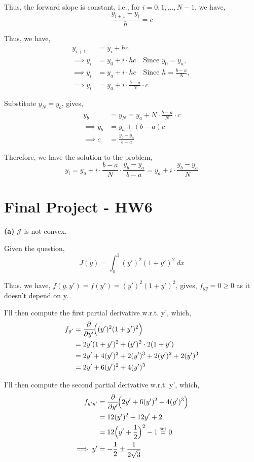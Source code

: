 \documentclass[12pt]{article}
\begin{document}
Thus, the forward slope is constant, i.e., for $i = 0, 1, ..., N-1$, we have, 
$$
\frac{y_{i+1}-y_i}{h}=c
$$

Thus, we have, 
\begin{align*}
	y_{i+1} &= y_i + hc \\
	\implies y_i &=y_0+i \cdot hc \quad \text{Since $y_0=y_a$, }\\
	\implies y_i &=y_a+i \cdot hc \quad \text{Since $h = \frac{b-a}{N}$, } \\
	\implies y_i &=y_a+i \cdot \frac{b-a}{N} \cdot c
\end{align*}

Substitute $y_N=y_b$, gives, 
\begin{align*}
	y_b &= y_N = y_a + N \cdot \frac{b-a}{N} \cdot c \\
	\implies y_b &= y_a + (b-a)c \\
	\implies c &= \frac{y_b-y_a}{b-a}
\end{align*}

Therefore, we have the solution to the problem, 
$$y_i = y_a + i \cdot \frac{b-a}{N} \cdot \frac{y_b-y_a}{b-a} = y_a + i \cdot \frac{y_b-y_a}{N}$$

\newpage

\section{Final Project - HW6}
\textbf{(a)} $\mathcal J$ is not convex.

Given the question, 
$$J(y)=\int_0^1 (y')^2(1+y')^2\ dx$$

Thus, we have, $f(y, y') = f(y') = (y')^2(1+y')^2$, gives, $f_{yy} = 0 \ge 0$ as it doesn't depend on y.

I'll then compute the first partial derivative w.r.t. y', which,
\begin{align*}
f_{y'}
&=\frac{\partial}{\partial y'}\!\Bigl((y')^2(1+y')^2\Bigr) \\
&= 2y'(1+y')^2 + (y')^2 \cdot 2(1+y') \\
&= 2y' + 4(y')^2 + 2(y')^3 + 2(y')^2 + 2(y')^3 \\
&= 2y' + 6(y')^2 + 4(y')^3
\end{align*}

I'll then compute the second partial derivative w.r.t. y', which, 
\begin{align*}
f_{y'y'}
&=\frac{\partial}{\partial y'}\!\Bigl(2y' + 6(y')^2 + 4(y')^3\Bigr)\\
&=12 (y')^2 + 12y' + 2 \\
&=12\Bigl(y' + \frac12\Bigr)^2-1 \overset{\text{set}}{=} 0 \\
\implies y' &= -\frac{1}{2}\pm \frac{1}{2\sqrt3}
\end{align*}
\end{document}
